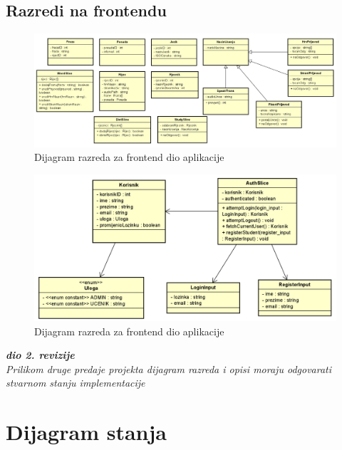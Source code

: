 \subsection{Razredi na frontendu}

\begin{figure}[H]
	\includegraphics[scale=0.5]{dijagrami/class_front.png}
	\centering
	\caption{Dijagram razreda za frontend dio aplikacije}
	\label{fig:class-front}
\end{figure}

\begin{figure}[H]
	\includegraphics[scale=0.55]{dijagrami/class_front_implemented.png}
	\centering
	\caption{Dijagram razreda za frontend dio aplikacije}
	\label{fig:class-front}
\end{figure}

			
			\textbf{\textit{dio 2. revizije}}\\			
			
			\textit{Prilikom druge predaje projekta dijagram razreda i opisi moraju odgovarati stvarnom stanju implementacije}
			
			
			
			\eject
		
		\section{Dijagram stanja}
			
